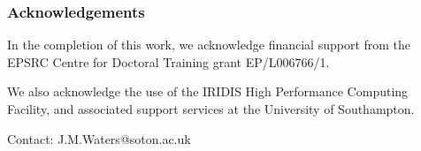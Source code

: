 \documentclass{beamer}
\begin{document}
\begin{frame}
	\frametitle{Acknowledgements}
	In the completion of this work, we acknowledge financial support from the EPSRC Centre for Doctoral Training grant EP/L006766/1. \newline
	
	We also acknowledge the use of the IRIDIS High Performance Computing Facility, and associated support services at the University of
Southampton. \newline

	Contact: J.M.Waters@soton.ac.uk
\end{frame}
\end{document}
